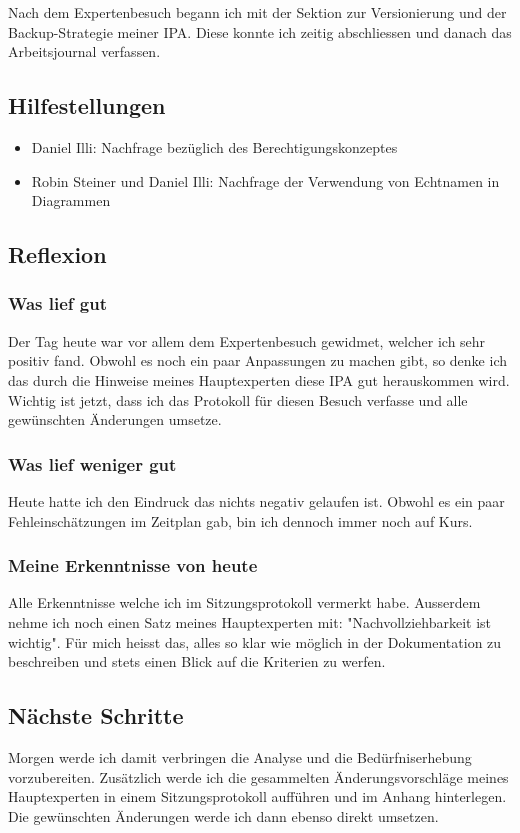 Nach dem Expertenbesuch begann ich mit der Sektion zur Versionierung und der Backup-Strategie meiner IPA. Diese konnte ich zeitig abschliessen und danach das Arbeitsjournal verfassen.

\subsection*{Hilfestellungen}
\begin{itemize}
    \item Daniel Illi: Nachfrage bezüglich des Berechtigungskonzeptes
    \item Robin Steiner und Daniel Illi: Nachfrage der Verwendung von Echtnamen in Diagrammen
\end{itemize}

\subsection*{Reflexion}

\subsubsection*{Was lief gut}
Der Tag heute war vor allem dem Expertenbesuch gewidmet, welcher ich sehr positiv fand. Obwohl es noch ein paar Anpassungen zu
machen gibt, so denke ich das durch die Hinweise meines Hauptexperten diese IPA gut herauskommen wird. Wichtig ist jetzt, dass ich das 
Protokoll für diesen Besuch verfasse und alle gewünschten Änderungen umsetze. 

\subsubsection*{Was lief weniger gut}
Heute hatte ich den Eindruck das nichts negativ gelaufen ist. Obwohl es ein paar Fehleinschätzungen im
Zeitplan gab, bin ich dennoch immer noch auf Kurs.

\subsubsection*{Meine Erkenntnisse von heute}
Alle Erkenntnisse welche ich im Sitzungsprotokoll vermerkt habe. Ausserdem nehme ich noch einen Satz meines Hauptexperten
mit: "Nachvollziehbarkeit ist wichtig". Für mich heisst das, alles so klar wie möglich in der Dokumentation zu beschreiben und 
stets einen Blick auf die Kriterien zu werfen.

\subsection*{Nächste Schritte}
Morgen werde ich damit verbringen die Analyse und die Bedürfniserhebung vorzubereiten. Zusätzlich werde
ich die gesammelten Änderungsvorschläge meines Hauptexperten in einem Sitzungsprotokoll aufführen und im Anhang hinterlegen.
Die gewünschten Änderungen werde ich dann ebenso direkt umsetzen.

\pagebreak

